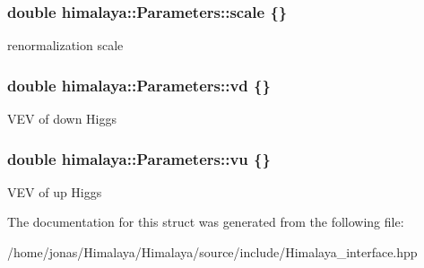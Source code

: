 \subsubsection[{\texorpdfstring{scale}{scale}}]{\setlength{\rightskip}{0pt plus 5cm}double himalaya\+::\+Parameters\+::scale \{\}}\hypertarget{structhimalaya_1_1Parameters_a88f2975f66e3b8bc32f973606f2579c4}{}\label{structhimalaya_1_1Parameters_a88f2975f66e3b8bc32f973606f2579c4}
renormalization scale 
\subsubsection[{\texorpdfstring{vd}{vd}}]{\setlength{\rightskip}{0pt plus 5cm}double himalaya\+::\+Parameters\+::vd \{\}}\hypertarget{structhimalaya_1_1Parameters_a109a6a905bbc8963010571546dd2f11b}{}\label{structhimalaya_1_1Parameters_a109a6a905bbc8963010571546dd2f11b}
V\+EV of down Higgs 
\subsubsection[{\texorpdfstring{vu}{vu}}]{\setlength{\rightskip}{0pt plus 5cm}double himalaya\+::\+Parameters\+::vu \{\}}\hypertarget{structhimalaya_1_1Parameters_aa3c40d7f24703d8fba20e9b23ae95c4d}{}\label{structhimalaya_1_1Parameters_aa3c40d7f24703d8fba20e9b23ae95c4d}
V\+EV of up Higgs 

The documentation for this struct was generated from the following file\+:\begin{DoxyCompactItemize}
\item 
/home/jonas/\+Himalaya/\+Himalaya/source/include/Himalaya\+\_\+interface.\+hpp\end{DoxyCompactItemize}
